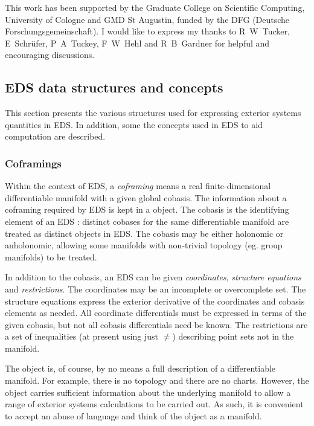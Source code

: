 This work has been supported by the Graduate College on Scientific
Computing, University of Cologne and GMD St Augustin, funded by the DFG (Deutsche
Forschungsgemeinschaft). I would like to express my thanks to R~W~Tucker,
E~Schr{\"u}fer, P~A~Tuckey, F~W~Hehl and R~B~Gardner for helpful and
encouraging discussions.




\subsection{EDS data structures and concepts}
\label{EDS data structures and concepts}

This section presents the various structures used for expressing exterior
systems quantities in EDS. In addition, some the concepts used in EDS to
aid computation are described.

\subsubsection{Coframings}
\label{Coframings}

Within the context of EDS, a {\it coframing} means a real
finite-dimensional differentiable manifold with a given global cobasis.
The information about a coframing required by EDS is kept in a
 object. The cobasis is the identifying element of an
EDS : distinct cobases for the same differentiable
manifold are treated as distinct  objects in EDS. The
cobasis may be either holonomic or anholonomic, allowing some manifolds
with non-trivial topology (eg.  group manifolds) to be treated. 

In addition to the cobasis, an EDS  can be given {\it
coordinates}, {\it structure equations} and {\it restrictions}. The
coordinates may be an incomplete or overcomplete set. The structure
equations express the exterior derivative of the coordinates and cobasis
elements as needed.  All coordinate differentials must be expressed in
terms of the given cobasis, but not all cobasis differentials need be
known. The restrictions are a set of inequalities (at present using just
$\neq$) describing point sets not in the manifold. 

The  object is, of course, by no means a full
description of a differentiable manifold. For example, there is no
topology and there are no charts. However, the  object
carries sufficient information about the underlying manifold to allow a
range of exterior systems calculations to be carried out. As such, it is
convenient to accept an abuse of language and think of the
 object as a manifold. 


